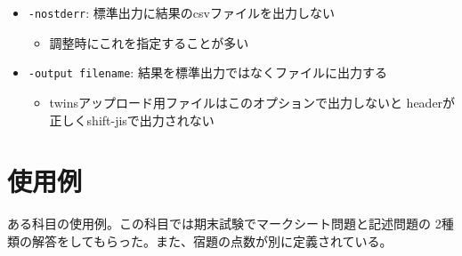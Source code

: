 \begin{itemize}
\item \texttt{-nostderr}: 標準出力に結果のcsvファイルを出力しない

\begin{itemize}
\item 調整時にこれを指定することが多い

\end{itemize}

\item \texttt{-output filename}: 結果を標準出力ではなくファイルに出力する

\begin{itemize}
\item twinsアップロード用ファイルはこのオプションで出力しないと
headerが正しくshift-jisで出力されない

\end{itemize}

\end{itemize}

\section{使用例}
\label{使用例}

ある科目の使用例。この科目では期末試験でマークシート問題と記述問題の
2種類の解答をしてもらった。また、宿題の点数が別に定義されている。

